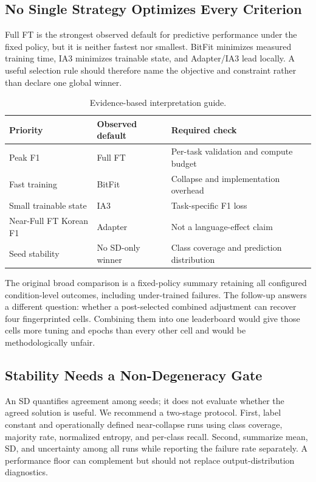 \documentclass{SPC}
\begin{document}
\subsection{No Single Strategy Optimizes Every Criterion}

Full FT is the strongest observed default for predictive performance under the fixed policy, but it is neither fastest nor smallest. BitFit minimizes measured training time, IA3 minimizes trainable state, and Adapter/IA3 lead locally. A useful selection rule should therefore name the objective and constraint rather than declare one global winner.

\begin{table}[!t]
\caption{Evidence-based interpretation guide.}
\label{tab:guide}
\centering
\scriptsize
\setlength{\tabcolsep}{3pt}
\begin{tabularx}{\columnwidth}{lXX}
\toprule
Priority & Observed default & Required check \\
\midrule
Peak F1 & Full FT & Per-task validation and compute budget \\
Fast training & BitFit & Collapse and implementation overhead \\
Small trainable state & IA3 & Task-specific F1 loss \\
Near-Full FT Korean F1 & Adapter & Not a language-effect claim \\
Seed stability & No SD-only winner & Class coverage and prediction distribution \\
\bottomrule
\end{tabularx}
\end{table}

The original broad comparison is a fixed-policy summary retaining all configured condition-level outcomes, including under-trained failures. The follow-up answers a different question: whether a post-selected combined adjustment can recover four fingerprinted cells. Combining them into one leaderboard would give those cells more tuning and epochs than every other cell and would be methodologically unfair.

\subsection{Stability Needs a Non-Degeneracy Gate}

An SD quantifies agreement among seeds; it does not evaluate whether the agreed solution is useful. We recommend a two-stage protocol. First, label constant and operationally defined near-collapse runs using class coverage, majority rate, normalized entropy, and per-class recall. Second, summarize mean, SD, and uncertainty among all runs while reporting the failure rate separately. A performance floor can complement but should not replace output-distribution diagnostics.
\end{document}

